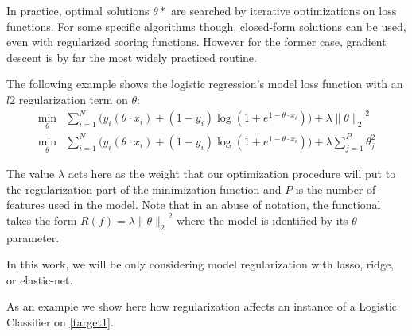 In practice, optimal solutions $\theta*$ are searched by iterative optimizations on loss functions.
For some specific algorithms though, closed-form solutions can be used, even with regularized scoring functions.
However for the former case, gradient descent is by far the most widely practiced routine.

The following example shows the logistic regression's model loss function with an $l2$ regularization term on $\theta$:
\begin{equation}\label{eq:logitRegularization}
\begin{split}
\min_{\theta} & \sum_{i=1}^N \big(y_i ( \theta \cdot x_i ) + (1- y_i)\log(1 + e^{1- \theta \cdot x_i} ) \big) + \lambda { \| \theta \|_{2}}^2 \\
\min_{\theta} & \sum_{i=1}^N \big(y_i ( \theta \cdot x_i ) + (1- y_i)\log(1 + e^{1- \theta \cdot x_i} ) \big) + \lambda \sum_{j=1}^P \theta_j^2
\end{split}
\end{equation}




The value $\lambda$ acts here as the weight that our optimization procedure will put to the regularization part of the minimization function and $P$ is the number of features used in the model.
Note that in an abuse of notation, the functional takes the form $R(f) = \lambda { \| \theta \|_{2}}^2$ where the model is identified by its $\theta$ parameter.

In this work, we will be only considering model regularization with lasso, ridge, or elastic-net.

As an example we show here how regularization affects an instance of a Logistic Classifier on \cref{target1}.


